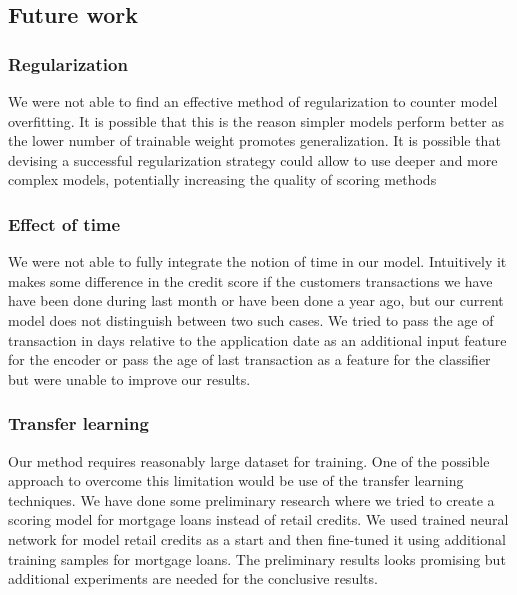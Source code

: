 \documentclass[sigconf]{acmart}
\begin{document}
\subsection{Future work}

\subsubsection{Regularization}

We were not able to find an effective method of regularization to counter model overfitting. It is possible that this is the reason simpler models perform better as the lower number of trainable weight promotes generalization. It is possible that devising a successful regularization strategy could allow to use deeper and more complex models, potentially increasing the quality of scoring methods

\subsubsection{Effect of time}

We were not able to fully integrate the notion of time in our model. Intuitively it makes some difference in the credit score if the customers transactions we have have been done during last month or have been done a year ago, but our current model does not distinguish between two such cases. We tried to pass the age of transaction in days relative to the application date as an additional input feature for the encoder or pass the age of last transaction as a feature for the classifier but were unable to improve our results. 

\subsubsection{Transfer learning}

Our method requires reasonably large dataset for training. One of the possible approach to overcome this limitation would be use of the transfer learning techniques. We have done some preliminary research where we tried to create a scoring model for mortgage loans instead of retail credits. We used trained neural network for model retail credits as a start and then fine-tuned it using additional training samples for mortgage loans. The preliminary results looks promising but additional experiments are needed for the conclusive results.




\end{document}
